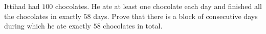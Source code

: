 Ittihad had $100$ chocolates. He ate at least one chocolate each day and finished all the chocolates in exactly $58$ days. Prove that there is a block of consecutive days during which he ate exactly $58$ chocolates in total.
